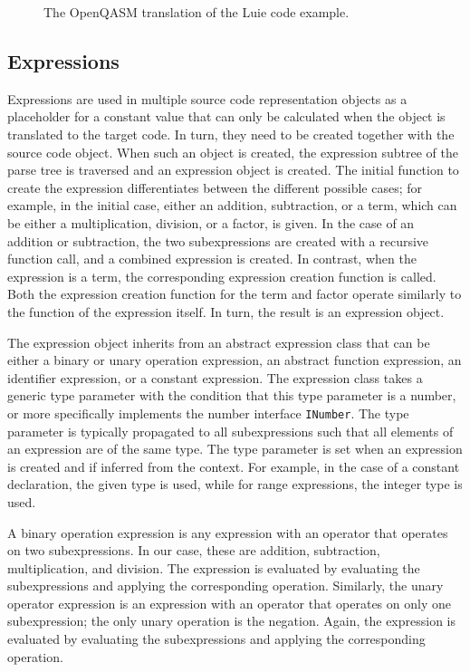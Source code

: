 \begin{figure}
    \centering
    
    \caption{The OpenQASM translation of the Luie code example.}
    \label{fig:codeGen_target_example}
\end{figure}


\subsection{Expressions}
\label{sec:implementation_expression}
Expressions are used in multiple source code representation objects as a placeholder for a constant value that can only be calculated when the object is translated to the target code. In turn, they need to be created together with the source code object. When such an object is created, the expression subtree of the parse tree is traversed and an expression object is created. The initial function to create the expression differentiates between the different possible cases; for example, in the initial case, either an addition, subtraction, or a term, which can be either a multiplication, division, or a factor, is given. In the case of an addition or subtraction, the two subexpressions are created with a recursive function call, and a combined expression is created. In contrast, when the expression is a term, the corresponding expression creation function is called. Both the expression creation function for the term and factor operate similarly to the function of the expression itself. In turn, the result is an expression object. 

The expression object inherits from an abstract expression class that can be either a binary or unary operation expression, an abstract function expression, an identifier expression, or a constant expression. The expression class takes a generic type parameter with the condition that this type parameter is a number, or more specifically implements the number interface \texttt{INumber}. The type parameter is typically propagated to all subexpressions such that all elements of an expression are of the same type. The type parameter is set when an expression is created and if inferred from the context. For example, in the case of a constant declaration, the given type is used, while for range expressions, the integer type is used.

A binary operation expression is any expression with an operator that operates on two subexpressions. In our case, these are addition, subtraction, multiplication, and division. The expression is evaluated by evaluating the subexpressions and applying the corresponding operation. Similarly, the unary operator expression is an expression with an operator that operates on only one subexpression; the only unary operation is the negation. Again, the expression is evaluated by evaluating the subexpressions and applying the corresponding operation. 

